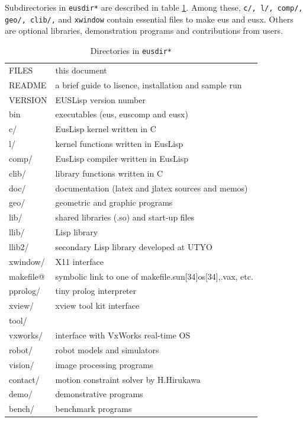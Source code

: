 Subdirectories in  {\tt *eusdir*} are described in table \ref{Directories}.
Among these, 
{\tt c/, l/, comp/, geo/, clib/,} and {\tt xwindow} contain essential
files to make eus and eusx. Others are optional libraries, demonstration
programs and contributions from users.

\begin{table}
\begin{center}
{\footnotesize
\begin{tabular}{|l | l|}\hline 
FILES &  this document \\
README &  a brief guide to lisence, installation and sample run\\
VERSION &  EUSLisp version number\\
bin &  executables (eus, euscomp and eusx) \\
c/ &  EusLisp kernel written in C\\
l/ &  kernel functions written in EusLisp\\
comp/ &  EusLisp compiler written in EusLisp\\
clib/ &  library functions written in C\\
doc/ &  documentation (latex and jlatex sources and memos)\\
geo/ &  geometric and graphic programs\\
lib/ & shared libraries (.so) and start-up files\\
llib/ &  Lisp library \\
llib2/ &  secondary Lisp library developed at UTYO\\
xwindow/ &  X11 interface\\
makefile@ &  symbolic link to one of makefile.sun[34]os[34],.vax, etc.\\
pprolog/ &  tiny prolog interpreter\\
xview/ &  xview tool kit interface\\
tool/ & \\
vxworks/ & interface with VxWorks real-time OS\\
robot/ & robot models and simulators\\
vision/ &  image processing programs\\
contact/ & motion constraint solver by H.Hirukawa
\cite{Hirukawa:1991a,Hirukawa:1991b,Hirukawa:1991c}\\
demo/ &  demonstrative programs\\
bench/ &  benchmark programs\\ \hline
\end{tabular}
}
\end{center}
\caption{\label{Directories}Directories in {\tt *eusdir*}}
\end{table}

